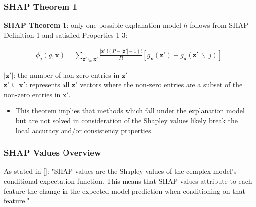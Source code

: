 
\begin{frame}\frametitle{SHAP Theorem 1}
\textbf{SHAP Theorem 1}: only one possible explanation model $h$ follows from SHAP Definition 1 and satisfied Properties 1-3:

	\begin{equation}
	\begin{aligned}	
		\phi_j(g,\mathbf{x}) = \sum_{\mathbf{z'} \subseteq \mathbf{x'} } \frac{\left\vert{\mathbf{z'}}\right\vert!(P-\left\vert{\mathbf{z'}}\right\vert-1)!}{P!} \left[g_\mathbf{x}(\mathbf{z'}) - g_\mathbf{x}(\mathbf{z'} \: \backslash \: j) \right]
	\end{aligned}
	\end{equation}

$\left\vert{\mathbf{z'}}\right\vert$: the number of non-zero entries in $\mathbf{z'}$\\
$\mathbf{z'} \subseteq \mathbf{x'}$: represents all $\mathbf{z'}$ vectors where the non-zero entries are a subset of the non-zero entries in $\mathbf{x'}$.
\bigskip
\begin{itemize}
	\item This theorem implies that methods which fall under the explanation model but are not solved in consideration of the Shapley values likely break the local accuracy and/or consistency properties.
\end{itemize}

\end{frame}


\begin{frame}\frametitle{SHAP Values Overview}

As stated in [\cite{shapley}]: "SHAP values are the Shapley values of the complex model's conditional expectation function. This means that SHAP values attribute to each feature the change in the expected model prediction when conditioning on that feature."\\

\end{frame}



